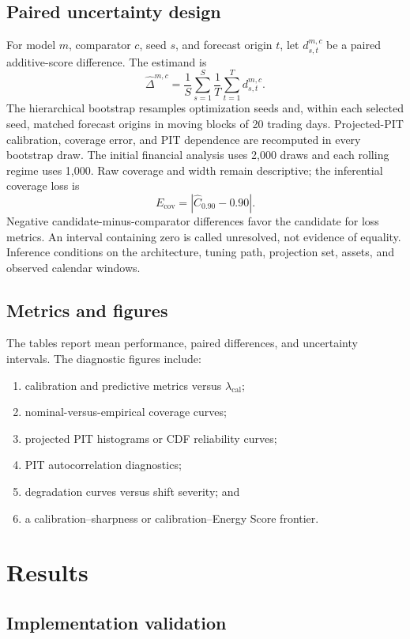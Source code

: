 \documentclass[11pt]{article}
\begin{document}
\subsection{Paired uncertainty design}

For model $m$, comparator $c$, seed $s$, and forecast origin $t$, let
$d_{s,t}^{m,c}$ be a paired additive-score difference. The estimand is
\[
 \widehat\Delta^{m,c}=\frac{1}{S}\sum_{s=1}^S\frac{1}{T}
 \sum_{t=1}^T d_{s,t}^{m,c}.
\]
The hierarchical bootstrap resamples optimization seeds and, within each selected
seed, matched forecast origins in moving blocks of 20 trading days. Projected-PIT
calibration, coverage error, and PIT dependence are recomputed in every bootstrap
draw. The initial financial analysis uses 2,000 draws and each rolling regime uses
1,000. Raw coverage and width remain descriptive; the inferential coverage loss is
\[
 E_{\mathrm{cov}}=|\widehat C_{0.90}-0.90|.
\]
Negative candidate-minus-comparator differences favor the candidate for loss
metrics. An interval containing zero is called unresolved, not evidence of
equality. Inference conditions on the architecture, tuning path, projection set,
assets, and observed calendar windows.

\subsection{Metrics and figures}

The tables report mean performance, paired differences, and uncertainty
intervals. The diagnostic figures include:
\begin{enumerate}
    \item calibration and predictive metrics versus $\lambda_{\mathrm{cal}}$;
    \item nominal-versus-empirical coverage curves;
    \item projected PIT histograms or CDF reliability curves;
    \item PIT autocorrelation diagnostics;
    \item degradation curves versus shift severity; and
    \item a calibration--sharpness or calibration--Energy Score frontier.
\end{enumerate}

\section{Results}

\subsection{Implementation validation}
\end{document}
